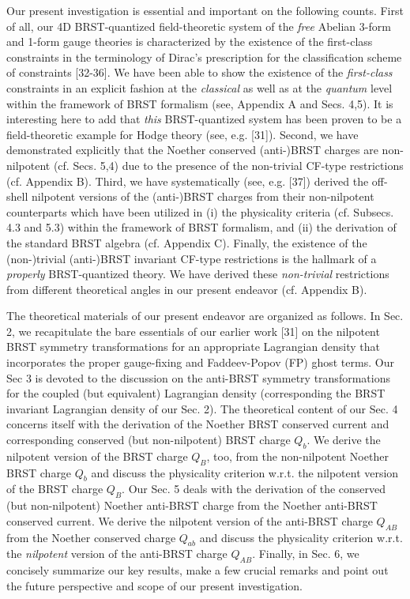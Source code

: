 \documentclass[12pt]{article}
\begin{document}
Our present investigation is essential and important on the following counts. First of all, our 4D BRST-quantized field-theoretic system of 
the {\it free} Abelian 3-form and 1-form gauge theories is characterized by the existence of the first-class constraints in the terminology
of Dirac's prescription for the classification scheme of constraints [32-36]. We have been able to show the existence of the {\it first-class} constraints
in an explicit fashion at the {\it classical} as well as at the {\it quantum } level within the framework of BRST formalism
(see, Appendix A and Secs. 4,5). It is interesting here to add that {\it this} BRST-quantized system has been proven to be a
field-theoretic example for Hodge theory  (see, e.g. [31]).
Second, we have demonstrated explicitly that the Noether conserved 
(anti-)BRST charges are non-nilpotent (cf. Secs. 5,4) due to the presence of 
the non-trivial CF-type restrictions (cf. Appendix B). Third, we have 
systematically (see, e.g. [37]) derived the off-shell nilpotent versions of the (anti-)BRST charges from
their non-nilpotent counterparts which have been utilized in (i) the physicality criteria (cf. Subsecs. 4.3 and 5.3) within the framework of
BRST formalism, and (ii) the derivation of the standard BRST algebra (cf. Appendix C). Finally, the existence of the 
(non-)trivial (anti-)BRST invariant
CF-type restrictions is the hallmark of a {\it properly} BRST-quantized theory. We have derived these {\it non-trivial} restrictions
from different theoretical angles in our present endeavor (cf. Appendix B).





The theoretical materials of our present endeavor are organized as follows. In Sec. 2, we recapitulate the bare
essentials of our earlier work [31] on the nilpotent BRST symmetry transformations  for an appropriate Lagrangian density that incorporates the
proper gauge-fixing and Faddeev-Popov (FP) ghost terms. Our Sec 3 is devoted to the 
discussion on the anti-BRST symmetry  transformations  for the coupled (but equivalent) Lagrangian density (corresponding the 
BRST invariant Lagrangian density of our Sec. 2). The theoretical content of our Sec. 4 concerns itself with the 
derivation of the Noether BRST conserved current and corresponding conserved (but non-nilpotent) BRST charge $Q_b$. We derive the 
nilpotent version of the BRST charge $Q_B$, too, from the non-nilpotent Noether BRST charge $Q_b$ and discuss the physicality criterion w.r.t. the nilpotent
version of the BRST charge  $Q_B$.
Our Sec. 5 deals with the derivation of the conserved (but non-nilpotent) Noether anti-BRST charge from the Noether anti-BRST conserved current.
We derive the nilpotent version of the anti-BRST charge $Q_{AB}$ from the Noether conserved charge $Q_{ab}$ and discuss the physicality criterion w.r.t. the 
{\it nilpotent} version of the anti-BRST charge $Q_{AB}$. Finally, in Sec. 6, we concisely summarize our key results, make a few crucial 
remarks and point out the future perspective and scope of our present investigation.
\end{document}
